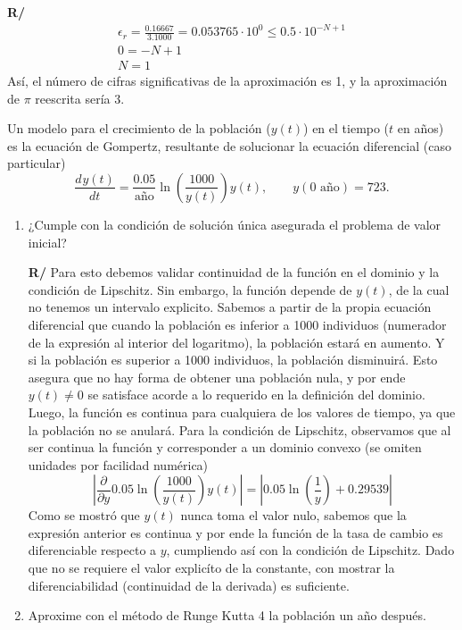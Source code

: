 \documentclass[12pt]{article}
\newcommand{\diff}[3]{\frac{d^{#3} #1}{d#2^{#3}}}
\newcommand{\pdiff}[3]{\frac{\partial^{#3} #1}{\partial#2^{#3}}}
\begin{document}
\begin{enumerate}[leftmargin=*,widest=9]
{\begin{enumerate}[label=\alph*]
\textbf{R/}
\begin{eqnarray*}
\epsilon_r = \frac{0.16667}{3.1000} = 0.053765 \cdot {10}^0 \leq 0.5 \cdot 10^{-N+1}\\
0 = -N + 1\\
N = 1
\end{eqnarray*}
Así, el número de cifras significativas de la aproximación es 1, y la aproximación de \(\pi \) reescrita sería \(3\).
    \end{enumerate}
    \item Un modelo para el crecimiento de la población (\(y(t)\)) en el tiempo (\(t\) en años) es la ecuación de Gompertz, resultante de solucionar la ecuación diferencial (caso particular)
    \[
\diff{y(t)}{t}{} = \frac{0.05}{\text{año}}\ln \left( \frac{1000}{y(t)} \right) y(t), \qquad y(0 \text{ año}) = 723.
    \]
    \begin{enumerate}[label=\alph*]
    \item ¿Cumple con la condición de solución única asegurada el problema de valor inicial?

\textbf{R/} Para esto debemos validar continuidad de la función en el dominio y la condición de Lipschitz. Sin embargo, la función depende de \(y(t)\), de la cual no tenemos un intervalo explicito.
Sabemos a partir de la propia ecuación diferencial que cuando la población es inferior a 1000 individuos (numerador de la expresión al interior del logaritmo), la población estará en aumento. Y si la población es superior a 1000 individuos, la población disminuirá. Esto asegura que no hay forma de obtener una población nula, y por ende \(y(t) \neq 0\) se satisface acorde a lo requerido en la definición del dominio. Luego, la función es continua para cualquiera de los valores de tiempo, ya que la población no se anulará.
Para la condición de Lipschitz, observamos que al ser continua la función y corresponder a un dominio convexo (se omiten unidades por facilidad numérica)
\[
\left\vert \pdiff{}{y}{} 0.05\ln \left( \frac{1000}{y(t)} \right) y(t) \right\vert = \left\vert 0.05\ln \left( \frac{1}{y} \right) + 0.29539 \right\vert
\]
Como se mostró que \(y(t)\) nunca toma el valor nulo, sabemos que la expresión anterior es continua y por ende la función de la tasa de cambio es diferenciable respecto a \(y\), cumpliendo así con la condición de Lipschitz.
Dado que no se requiere el valor explicíto de la constante, con mostrar la diferenciabilidad (continuidad de la derivada) es suficiente.
    \item Aproxime con el método de Runge Kutta 4 la población un año después.


\end{enumerate}}
\end{enumerate}
\end{document}
